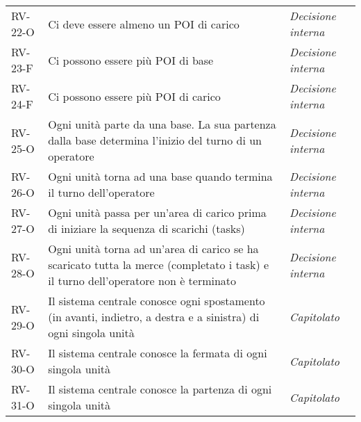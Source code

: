 \begin{longtable}{ 
		>{\centering}p{} 
		>{}p{}
		>{\centering \it}p{} }
RV-22-O & Ci deve essere almeno un POI di carico & Decisione interna\tabularnewline
RV-23-F & Ci possono essere più POI di base & Decisione interna\tabularnewline
RV-24-F & Ci possono essere più POI di carico & Decisione interna\tabularnewline
RV-25-O & Ogni unità parte da una base. La sua partenza dalla base determina l'inizio del turno di un operatore & Decisione interna\tabularnewline
RV-26-O & Ogni unità torna ad una base quando termina il turno dell’operatore & Decisione interna\tabularnewline
RV-27-O & Ogni unità passa per un’area di carico prima di iniziare la sequenza di scarichi (tasks) & Decisione interna\tabularnewline
RV-28-O & Ogni unità torna ad un'area di carico se ha scaricato tutta la merce (completato i task) e il turno dell’operatore non è terminato & Decisione interna\tabularnewline
RV-29-O & Il sistema centrale conosce ogni spostamento (in avanti, indietro, a destra e a sinistra) di ogni singola unità & Capitolato\tabularnewline
RV-30-O & Il sistema centrale conosce la fermata di ogni singola unità & Capitolato\tabularnewline
RV-31-O & Il sistema centrale conosce la partenza di ogni singola unità & Capitolato\tabularnewline
\end{longtable}

